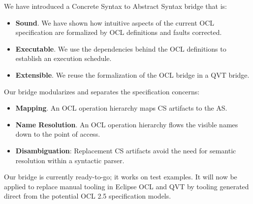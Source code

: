 \documentclass{llncs}
\begin{document}

We have introduced a Concrete Syntax to Abstract Syntax bridge that is:
\begin{itemize}
\item \textbf{Sound}. We have shown how intuitive aspects of the current OCL specification are formalized by OCL definitions and faults corrected.
\item \textbf{Executable}. We use the dependencies behind the OCL definitions to establish an execution schedule.
\item \textbf{Extensible}. We reuse the formalization of the OCL bridge in a QVT bridge.
\end{itemize}

Our bridge modularizes and separates the specification concerns:
\begin{itemize}
\item \textbf{Mapping}. An OCL operation hierarchy maps CS artifacts to the AS.
\item \textbf{Name Resolution}. An OCL operation hierarchy flows the visible names down to the point of access.
\item \textbf{Disambiguation}: Replacement CS artifacts avoid the need for semantic resolution within a syntactic parser.
\end{itemize}

Our bridge is currently ready-to-go; it works on test examples. It will now be applied to replace manual tooling in Eclipse OCL and QVT by tooling generated direct from the potential OCL 2.5 specification models.




\end{document}
